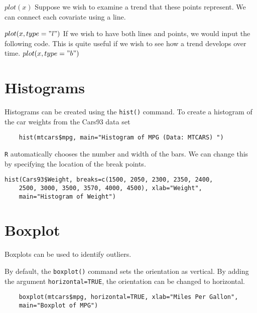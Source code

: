$plot(x)$
Suppose we wish to examine a trend that these points represent. We can connect each covariate using a line.

$plot(x, type = "l")$
If we wish to have both lines and points, we would input the following code. This is quite useful if we wish to see how a trend develops over time.
$plot(x, type = "b")$











\section{Histograms}
Histograms can be created using the \texttt{hist()} command.
To create a histogram of the car weights from the Cars93 data set
\footnotesize
\begin{myindentpar}{1cm}
	\begin{verbatim}
	hist(mtcars$mpg, main="Histogram of MPG (Data: MTCARS) ")
	\end{verbatim}
\end{myindentpar}\normalsize
\texttt{R} automatically chooses the number and width of the bars. We can
change this by specifying the location of the break points.
\footnotesize
\begin{myindentpar}{1cm}
	\begin{verbatim}hist(Cars93$Weight, breaks=c(1500, 2050, 2300, 2350, 2400,
	2500, 3000, 3500, 3570, 4000, 4500), xlab="Weight",
	main="Histogram of Weight")
	\end{verbatim}
\end{myindentpar}\normalsize



\section{Boxplot}
Boxplots can be used to identify outliers.

By default, the \texttt{boxplot()} command sets the orientation as vertical. By adding the argument \texttt{horizontal=TRUE}, the orientation can be changed to horizontal.
\footnotesize
\begin{framed}
	\begin{verbatim}
	boxplot(mtcars$mpg, horizontal=TRUE, xlab="Miles Per Gallon",
	main="Boxplot of MPG")
	\end{verbatim}
\end{framed}


